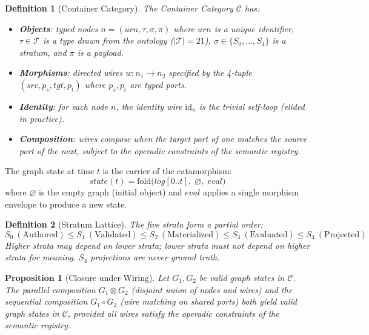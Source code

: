 \documentclass[submission,copyright,creativecommons]{eptcs}
\newtheorem{definition}{Definition}
\newtheorem{proposition}{Proposition}
\begin{document}
\begin{definition}[Container Category]
The \emph{Container Category} $\mathcal{C}$ has:
\begin{itemize}
  \item \textbf{Objects}: typed nodes $n = (\mathit{urn}, \tau, \sigma, \pi)$
        where $\mathit{urn}$ is a unique identifier, $\tau \in \mathcal{T}$ is
        a type drawn from the ontology ($|\mathcal{T}| = 21$), $\sigma \in
        \{S_0, \ldots, S_4\}$ is a stratum, and $\pi$ is a payload.
  \item \textbf{Morphisms}: directed wires $w\colon n_1 \to n_2$ specified by
        the 4-tuple $(\mathit{src}, p_s, \mathit{tgt}, p_t)$ where $p_s, p_t$
        are typed ports.
  \item \textbf{Identity}: for each node $n$, the identity wire
        $\mathrm{id}_n$ is the trivial self-loop (elided in practice).
  \item \textbf{Composition}: wires compose when the target port of one matches
        the source port of the next, subject to the operadic constraints of
        the semantic registry.
\end{itemize}
\end{definition}

The graph state at time $t$ is the carrier of the catamorphism:
\begin{equation}
\label{eq:cata}
\mathit{state}(t) = \mathrm{fold}\bigl(\mathit{log}[0..t],\; \varnothing,\;
\mathit{eval}\bigr)
\end{equation}
where $\varnothing$ is the empty graph (initial object) and $\mathit{eval}$
applies a single morphism envelope to produce a new state.

\begin{definition}[Stratum Lattice]
The five strata form a partial order:
\[
S_0\ (\text{Authored}) \leq S_1\ (\text{Validated}) \leq S_2\
(\text{Materialized}) \leq S_3\ (\text{Evaluated}) \leq S_4\ (\text{Projected})
\]
Higher strata may depend on lower strata; lower strata must not depend on
higher strata for meaning. $S_4$ projections are never ground truth.
\end{definition}

\begin{proposition}[Closure under Wiring]
\label{prop:closure}
Let $G_1, G_2$ be valid graph states in $\mathcal{C}$. The parallel
composition $G_1 \otimes G_2$ (disjoint union of nodes and wires) and the
sequential composition $G_1 \circ G_2$ (wire matching on shared ports) both
yield valid graph states in $\mathcal{C}$, provided all wires satisfy the
operadic constraints of the semantic registry.
\end{proposition}
\end{document}
